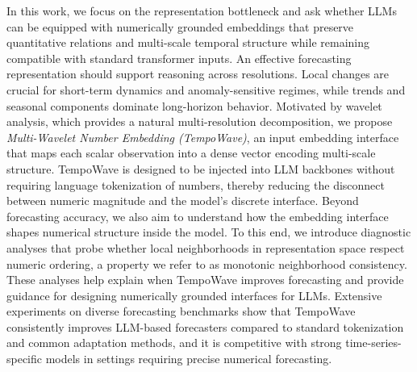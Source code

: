 \documentclass{article}
\begin{document}
In this work, we focus on the representation bottleneck and ask whether LLMs can be equipped with numerically grounded embeddings that preserve quantitative relations and multi-scale temporal structure while remaining compatible with standard transformer inputs.  An effective forecasting representation should support reasoning across resolutions.  Local changes are crucial for short-term dynamics and anomaly-sensitive regimes, while trends and seasonal components dominate long-horizon behavior.  Motivated by wavelet analysis, which provides a natural multi-resolution decomposition, we propose \textit{Multi-Wavelet Number Embedding (TempoWave)}, an input embedding interface that maps each scalar observation into a dense vector encoding multi-scale structure.  TempoWave is designed to be injected into LLM backbones without requiring language tokenization of numbers, thereby reducing the disconnect between numeric magnitude and the model's discrete interface.
Beyond forecasting accuracy, we also aim to understand how the embedding interface shapes numerical structure inside the model.  To this end, we introduce diagnostic analyses that probe whether local neighborhoods in representation space respect numeric ordering, a property we refer to as {monotonic neighborhood consistency}.  These analyses help explain when TempoWave improves forecasting and provide guidance for designing numerically grounded interfaces for LLMs.  Extensive experiments on diverse forecasting benchmarks show that TempoWave consistently improves LLM-based forecasters compared to standard tokenization and common adaptation methods, and it is competitive with strong time-series-specific models in settings requiring precise numerical forecasting.
\end{document}

